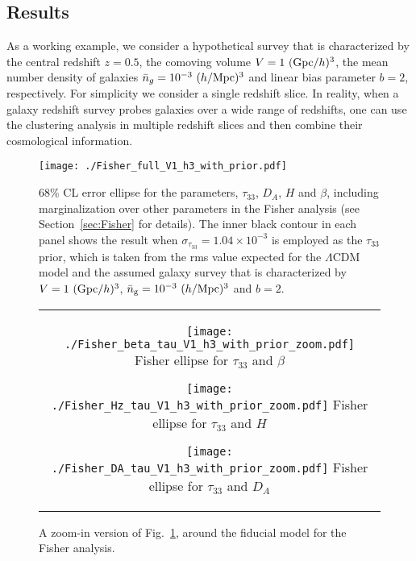\documentclass[prd,onecolumn,notitlepage,amsmath,amssymb,floatfix,superscriptaddress]{revtex4-1}
\begin{document}
\subsection{Results}

As a working example, we consider a hypothetical survey that is characterized by the central redshift 
$z=0.5$, the comoving volume $V=1~({\rm Gpc}/h)^3$, the mean number density of galaxies 
$\bar{n}_g=10^{-3}~(h/{\rm Mpc})^3$ and linear bias parameter $b=2$, respectively.
For simplicity we consider a single redshift slice. 
In reality, when a galaxy redshift survey probes galaxies over a wide range of redshifts, one 
can use the clustering analysis in multiple redshift slices and then combine their cosmological information. 

\begin{figure}
\centering \texttt{[image: ./Fisher\_full\_V1\_h3\_with\_prior.pdf]}
%
\caption{68\% CL error ellipse for the parameters, 
$\tau_{33}$, $D_A$, $H$ and $\beta$, including marginalization over other parameters in the Fisher analysis (see Section~\ref{sec:Fisher} for details). The inner black contour in each panel 
shows the result when $\sigma_{\tau_{33}}=1.04\times 10^{-3}$ is employed as the $\tau_{33}$ prior, which is taken from 
the rms value expected for the $\Lambda$CDM model and the assumed galaxy survey that is characterized by $V=1~({\rm Gpc}/h)^3$, 
$\bar{n}_{\rm g}=10^{-3}~(h/{\rm Mpc})^3$ and $b=2$.
 }
\label{fig:Fisher_full}

\end{figure}
\begin{figure}
\begin{tabular}{c}

	\begin{minipage}{0.33\hsize}
		\begin{center}
			\texttt{[image: ./Fisher\_beta\_tau\_V1\_h3\_with\_prior\_zoom.pdf]}
			Fisher ellipse for $\tau_{33}$ and $\beta$
		\end{center}
	\end{minipage}

	\begin{minipage}{0.33\hsize}
		\begin{center}
			\texttt{[image: ./Fisher\_Hz\_tau\_V1\_h3\_with\_prior\_zoom.pdf]}
			Fisher ellipse for $\tau_{33}$ and $H$
		\end{center}
	\end{minipage}

	\begin{minipage}{0.33\hsize}
		\begin{center}
			\texttt{[image: ./Fisher\_DA\_tau\_V1\_h3\_with\_prior\_zoom.pdf]}
			Fisher ellipse for $\tau_{33}$ and $D_A$
		\end{center}
	\end{minipage}

\end{tabular}
\caption{A zoom-in version of Fig.~\ref{fig:Fisher_full}, around the fiducial model for the Fisher analysis.}
\label{fig:Fisher_zoom}
\end{figure}
\end{document}
